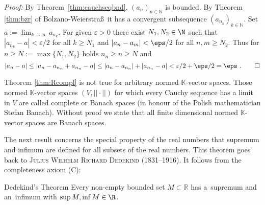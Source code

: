 {\em Proof:} 
By Theorem~\ref{thm:cauchseqbnd}, $(a_n)_{n\in\mathbb{N}}$ is bounded. By Theorem \ref{thm:bzr} of Bolzano-Weierstra\ss \ it has a convergent 
subsequence $(a_{n_k})_{k\in\mathbb{N}}$. Set $a:=\lim_{k\rightarrow\infty} a_{n_k}$. For given $\varepsilon>0$ there exist $N_1,N_2\in\N$ such 
that $|a_{n_k}-a|<\varepsilon/2$ for all $k\geq N_1$ and $|a_n-a_m|<\eps/2$ for all $n,m\geq N_2$. Thus for $n\geq N:=\max\{N_1,N_2\}$ holds
$n_n\geq n\geq N$ and $$|a_n-a|\leq|a_n-a_{n_n}+a_{n_n}-a|\leq|a_n-a_{n_n}|+|a_{n_n}-a|< \varepsilon/2+\eps/2=\eps \ . \qquad\Box$$


Theorem \ref{thm:Rcompl} is not true for arbitrary normed $\mathbb{K}$-vector spaces. 
Those normed $\mathbb{K}$-vector spaces $(V,||\cdot||)$ for which every Cauchy sequence has a limit in $V$ are called complete
or Banach spaces (in honour of the Polish mathematician Stefan Banach). 
Without proof we state that all finite dimensional normed $\mathbb{K}$-vector spaces are Banach spaces.

The next result concerns the special property of the real numbers that supremum and infimum are defined for all subsets of the real numbers. This theorem goes back to \textsc{Julius Wilhelm Richard Dedekind} (1831--1916). It follows from the completeness axiom (C):
\begin{Theorem}{Dedekind's Theorem}
\label{thm:bndmonseq}
 Every non-empty bounded set $M\subset \mathbb{R}$ has a~supremum and an~infimum with $\sup M,\inf M\in\R$.
\end{Theorem}


